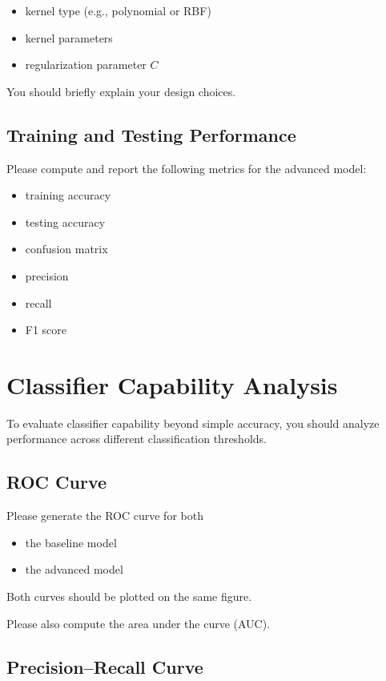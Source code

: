 \documentclass[12pt]{article}
\begin{document}
\begin{itemize}
\item kernel type (e.g., polynomial or RBF)
\item kernel parameters
\item regularization parameter $C$
\end{itemize}

You should briefly explain your design choices.

\subsection{Training and Testing Performance}

Please compute and report the following metrics for the advanced model:

\begin{itemize}
\item training accuracy
\item testing accuracy
\item confusion matrix
\item precision
\item recall
\item F1 score
\end{itemize}

\section{Classifier Capability Analysis}

To evaluate classifier capability beyond simple accuracy, you should analyze performance across different classification thresholds.

\subsection{ROC Curve}

Please generate the ROC curve for both

\begin{itemize}
\item the baseline model
\item the advanced model
\end{itemize}

Both curves should be plotted on the same figure.

Please also compute the area under the curve (AUC).

\subsection{Precision–Recall Curve}
\end{document}
